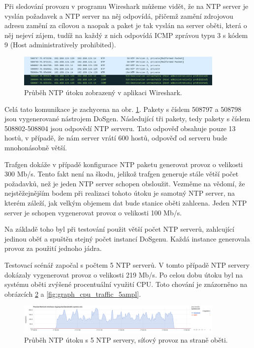 Při sledování provozu v programu Wireshark můžeme vidět, že na NTP server je vyslán požadavek  a NTP server na něj odpovídá, přičemž zamění zdrojovou adresu zamění za cílovou a naopak a paket je tak vyslán na server oběti, která o něj nejeví zájem, tudíž na každý z nich odpovídá ICMP zprávou typu 3 s kódem 9 (Host administratively prohibited).

\begin{figure} [h]
	\centering
	\includegraphics[width=0.9\textwidth]
	{obrazky/mon_getlist_1_wireshark_with_icmp_and_reply.png}
	\caption{Průběh NTP útoku zobrazený v  aplikaci Wireshark.}
	\label{fig:mon_getlist_1_wireshark_with_icmp_and_reply-img}
\end{figure}

Celá tato komunikace je zachycena na obr. \ref{fig:mon_getlist_1_wireshark_with_icmp_and_reply-img}. Pakety s číslem 508797 a 508798 jsou vygenerované nástrojem DoSgen. Následující tři pakety, tedy pakety s číslem 508802-508804 jsou odpovědí NTP serveru. Tato odpověď obsahuje pouze 13 hostů, v případě, že nám server vrátí 600 hostů, odpověď od serveru bude mnohonásobně větší.

Trafgen dokáže v případě konfigurace NTP paketu generovat provoz o velikosti 300 Mb/s. Tento fakt není na škodu, jelikož trafgen generuje stále větší počet požadavků, než je jeden NTP server schopen obsloužit. Vezměme na vědomí, že nejstěžejnějším bodem při realizaci tohoto útoku je samotný NTP server, na kterém záleží, jak velkým objemem dat bude stanice oběti zahlcena. Jeden NTP server je schopen vygenerovat provoz o velikosti 100 Mb/s.

Na základě toho byl při testování použit větší počet NTP serverů, zahlcující jedinou oběť a spuštěn stejný počet instancí DoSgenu. Každá instance generovala provoz za použití jednoho jádra.

Testovací scénář započal s počtem 5 NTP serverů. V tomto případě NTP servery dokázaly vygenerovat provoz o velikosti 219 Mb/s. Po celou dobu útoku byl na systému oběti zvýšené procentuální využití CPU. Toto chování je znázorněno na obrázcích \ref{fig:graph_ntp_traffic_5ampl} a \ref{fig:graph_cpu_traffic_5ampl}.


\begin{figure} [h]
	\centering
	\includegraphics[width=0.9\textwidth]
	{obrazky/grafy/graph_ntp_traffic_5ampl.png}
	\caption{Průběh NTP útoku s 5 NTP servery, síťový provoz na straně oběti.}
	\label{fig:graph_ntp_traffic_5ampl}
\end{figure}

